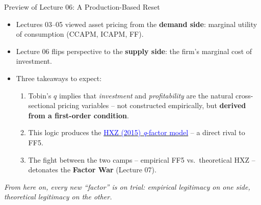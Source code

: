 \documentclass{beamer}
\begin{document}
\begin{frame}{Preview of Lecture 06: A Production-Based Reset}
	\begin{itemize}
		\item Lectures 03--05 viewed asset pricing from the \textbf{demand side}: marginal utility of consumption (CCAPM, ICAPM, FF).
		\item Lecture 06 flips perspective to the \textbf{supply side}: the firm's marginal cost of investment.
		\item Three takeaways to expect:
		\begin{enumerate}
			\item Tobin's $q$ implies that \textit{investment} and \textit{profitability} are the natural cross-sectional pricing variables -- not constructed empirically, but \textbf{derived from a first-order condition}.
			\item This logic produces the \href{https://doi.org/10.1093/rfs/hhu068}{\textcolor{blue}{HXZ (2015) \textit{q}-factor model}} -- a direct rival to FF5.
			\item The fight between the two camps -- empirical FF5 vs.\ theoretical HXZ -- detonates the \textbf{Factor War} (Lecture 07).
		\end{enumerate}
	\end{itemize}
	\vspace{4pt}
	\begin{center}
		\small \textit{From here on, every new ``factor'' is on trial: empirical legitimacy on one side, theoretical legitimacy on the other.}
	\end{center}
\end{frame}
\end{document}
